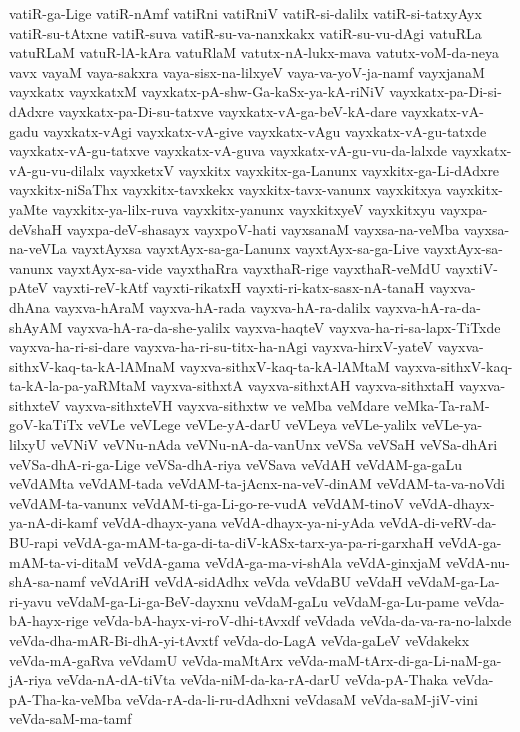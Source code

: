 {vatiR-ga-Lige
vatiR-nAmf
vatiRni
vatiRniV
vatiR-si-dalilx
vatiR-si-tatxyAyx
vatiR-su-tAtxne
vatiR-suva
vatiR-su-va-nanxkakx
vatiR-su-vu-dAgi
vatuRLa
vatuRLaM
vatuR-lA-kAra
vatuRlaM
vatutx-nA-lukx-mava
vatutx-voM-da-neya
vavx
vayaM
vaya-sakxra
vaya-sisx-na-lilxyeV
vaya-va-yoV-ja-namf
vayxjanaM
vayxkatx
vayxkatxM
vayxkatx-pA-shw-Ga-kaSx-ya-kA-riNiV
vayxkatx-pa-Di-si-dAdxre
vayxkatx-pa-Di-su-tatxve
vayxkatx-vA-ga-beV-kA-dare
vayxkatx-vA-gadu
vayxkatx-vAgi
vayxkatx-vA-give
vayxkatx-vAgu
vayxkatx-vA-gu-tatxde
vayxkatx-vA-gu-tatxve
vayxkatx-vA-guva
vayxkatx-vA-gu-vu-da-lalxde
vayxkatx-vA-gu-vu-dilalx
vayxketxV
vayxkitx
vayxkitx-ga-Lanunx
vayxkitx-ga-Li-dAdxre
vayxkitx-niSaThx
vayxkitx-tavxkekx
vayxkitx-tavx-vanunx
vayxkitxya
vayxkitx-yaMte
vayxkitx-ya-lilx-ruva
vayxkitx-yanunx
vayxkitxyeV
vayxkitxyu
vayxpa-deVshaH
vayxpa-deV-shasayx
vayxpoV-hati
vayxsanaM
vayxsa-na-veMba
vayxsa-na-veVLa
vayxtAyxsa
vayxtAyx-sa-ga-Lanunx
vayxtAyx-sa-ga-Live
vayxtAyx-sa-vanunx
vayxtAyx-sa-vide
vayxthaRra
vayxthaR-rige
vayxthaR-veMdU
vayxtiV-pAteV
vayxti-reV-kAtf
vayxti-rikatxH
vayxti-ri-katx-sasx-nA-tanaH
vayxva-dhAna
vayxva-hAraM
vayxva-hA-rada
vayxva-hA-ra-dalilx
vayxva-hA-ra-da-shAyAM
vayxva-hA-ra-da-she-yalilx
vayxva-haqteV
vayxva-ha-ri-sa-lapx-TiTxde
vayxva-ha-ri-si-dare
vayxva-ha-ri-su-titx-ha-nAgi
vayxva-hirxV-yateV
vayxva-sithxV-kaq-ta-kA-lAMnaM
vayxva-sithxV-kaq-ta-kA-lAMtaM
vayxva-sithxV-kaq-ta-kA-la-pa-yaRMtaM
vayxva-sithxtA
vayxva-sithxtAH
vayxva-sithxtaH
vayxva-sithxteV
vayxva-sithxteVH
vayxva-sithxtw
ve
veMba
veMdare
veMka-Ta-raM-goV-kaTiTx
veVLe
veVLege
veVLe-yA-darU
veVLeya
veVLe-yalilx
veVLe-ya-lilxyU
veVNiV
veVNu-nAda
veVNu-nA-da-vanUnx
veVSa
veVSaH
veVSa-dhAri
veVSa-dhA-ri-ga-Lige
veVSa-dhA-riya
veVSava
veVdAH
veVdAM-ga-gaLu
veVdAMta
veVdAM-tada
veVdAM-ta-jAcnx-na-veV-dinAM
veVdAM-ta-va-noVdi
veVdAM-ta-vanunx
veVdAM-ti-ga-Li-go-re-vudA
veVdAM-tinoV
veVdA-dhayx-ya-nA-di-kamf
veVdA-dhayx-yana
veVdA-dhayx-ya-ni-yAda
veVdA-di-veRV-da-BU-rapi
veVdA-ga-mAM-ta-ga-di-ta-diV-kASx-tarx-ya-pa-ri-garxhaH
veVdA-ga-mAM-ta-vi-ditaM
veVdA-gama
veVdA-ga-ma-vi-shAla
veVdA-ginxjaM
veVdA-nu-shA-sa-namf
veVdAriH
veVdA-sidAdhx
veVda
veVdaBU
veVdaH
veVdaM-ga-La-ri-yavu
veVdaM-ga-Li-ga-BeV-dayxnu
veVdaM-gaLu
veVdaM-ga-Lu-pame
veVda-bA-hayx-rige
veVda-bA-hayx-vi-roV-dhi-tAvxdf
veVdada
veVda-da-va-ra-no-lalxde
veVda-dha-mAR-Bi-dhA-yi-tAvxtf
veVda-do-LagA
veVda-gaLeV
veVdakekx
veVda-mA-gaRva
veVdamU
veVda-maMtArx
veVda-maM-tArx-di-ga-Li-naM-ga-jA-riya
veVda-nA-dA-tiVta
veVda-niM-da-ka-rA-darU
veVda-pA-Thaka
veVda-pA-Tha-ka-veMba
veVda-rA-da-li-ru-dAdhxni
veVdasaM
veVda-saM-jiV-vini
veVda-saM-ma-tamf
}
